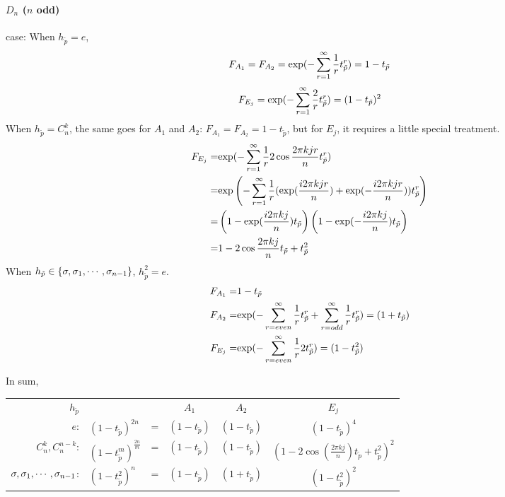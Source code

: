 \paragraph{$D_{n}$ ($n$ odd)} case:
When $h_{\tilde p}=e$,
\[
  F_{A_1}=F_{A_2}={\rm exp} (-\sum_{r=1}^\infty \frac{1}{r}t_{\tilde{p}}^r )
  =1-t_{\tilde p}
\]
\[
  F_{E_j}={\rm exp} (-\sum_{r=1}^\infty \frac{2}{r}t_{\tilde{p}}^r )
  =(1-t_{\tilde p})^2
\]
When $h_{\tilde p}=C_n^k$, the same goes for $A_1$ and $A_2$:
$F_{A_1}=F_{A_2}=1-t_{\tilde p}$, but for $E_j$, it requires a little
special treatment.
\begin{align*}
  F_{E_j}= & {\rm exp} (-\sum_{r=1}^\infty \frac{1}{r}2\cos\frac{2\pi kjr}{n}
             t_{\tilde{p}}^r ) \\
  = & {\rm exp} \left(-\sum_{r=1}^\infty \frac{1}{r}(\exp(\frac{i2\pi
      kjr}{n})+\exp(-\frac{i2\pi kjr}{n}))t_{\tilde{p}}^r \right) \\
  = & \left(1-\exp(\frac{i2\pi kj}{n})t_{\tilde p} \right)
      \left(1-\exp(-\frac{i2\pi kj}{n})t_{\tilde p} \right) \\
  = & 1-2\cos\frac{2\pi kj}{n}t_{\tilde p}+t_{\tilde p}^2
\end{align*}
When $h_{\tilde p}\in \{\sigma,\sigma_{1},\cdots,\sigma_{n-1}\}$,
$h_{\tilde p}^2=e$.
\begin{align*}
  F_{A_1}= &1-t_{\tilde p} \\
  F_{A_2}= &{\rm exp} (-\sum_{r=even}^\infty \frac{1}{r}t_{\tilde{p}}^r
             +\sum_{r=odd}^\infty \frac{1}{r}t_{\tilde{p}}^r )
             =(1+t_{\tilde p}) \\
  F_{E_j}= &{\rm exp} (-\sum_{r=even}^\infty \frac{1}{r}2t_{\tilde{p}}^r)
             =(1-t_{\tilde p}^2)
\end{align*}

In sum,

\vskip 12pt
\begin{tabular}{rlcccc}

  $h_{\tilde p}$ &  & &  $A_1$  &  $A_2$  &  $E_j$  \\
  $e$:
                 & $(1-t_{\tilde p} )^{2n}$  &=&$(1-t_{\tilde p})$ & $(1-t_{\tilde p})$ &
                                                                                          $ (1-t_{\tilde p})^4 $ \\
  $C_n^k,C_n^{n-k} $:
                 & $(1-t_{\tilde p}^m )^{\frac{2n}{m}}$ &=&  $(1-t_{\tilde p})$ & $(1-t_{\tilde p})$ &
                                                                                                       $ (1-2\cos(\frac{2\pi kj}{n})t_{\tilde p}+t^{2}_{\tilde p})^2 $ \\
  $\sigma,\sigma_{1},\cdots,\sigma_{n-1}$:
                 & $(1-t_{\tilde p}^2 )^{n}$ &=&  $(1-t_{\tilde p})$ &                      $(1+t_{\tilde p})$ &$ (1-t_{\tilde p}^2)^2 $ \\
\end{tabular}
\vskip 12pt
\noindent


